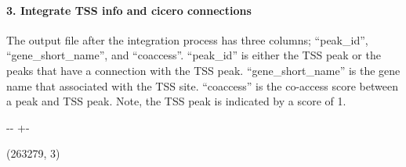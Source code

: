 \documentclass[letterpaper,10pt,english]{sphinxmanual}
\newlength\nbsphinxcodecellspacing
\begin{document}
\paragraph{3. Integrate TSS info and cicero connections}
\label{\detokenize{notebooks/01_ATAC-seq_data_processing/option1_scATAC-seq_data_analysis_with_cicero/02_preprocess_peak_data:3.-Integrate-TSS-info-and-cicero-connections}}
The output file after the integration process has three columns; “peak\_id”, “gene\_short\_name”, and “coaccess”. “peak\_id” is either the TSS peak or the peaks that have a connection with the TSS peak. “gene\_short\_name” is the gene name that associated with the TSS site. “coaccess” is the co-access score between a peak and TSS peak. Note, the TSS peak is indicated by a score of 1.

{
\begin{sphinxVerbatim}[commandchars=\\\{\}]
\llap{\color{nbsphinxin}[8]:\,\hspace{\fboxrule}\hspace{\fboxsep}}  
\end{sphinxVerbatim}
}

{

\kern-\sphinxverbatimsmallskipamount\kern-\baselineskip
\kern+\FrameHeightAdjust\kern-\fboxrule
\vspace{\nbsphinxcodecellspacing}

\begin{sphinxVerbatim}[commandchars=\\\{\}]
(263279, 3)
\end{sphinxVerbatim}
}
\end{document}

